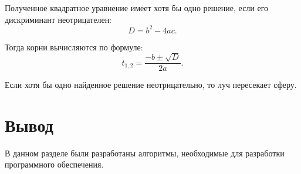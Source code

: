 Полученное квадратное уравнение имеет хотя бы одно решение, если его дискриминант неотрицателен:
\begin{equation}\label{sphd}
	D = b^2 - 4ac.
\end{equation}

Тогда корни вычисляются по формуле:
\begin{equation}
	t_{1,2} = \frac{-b \pm \sqrt{D}}{2a}.
\end{equation}

Если хотя бы одно найденное решение неотрицательно, то луч пересекает сферу.

\section*{Вывод}
В данном разделе были разработаны алгоритмы, необходимые для разработки программного обеспечения.

\clearpage
